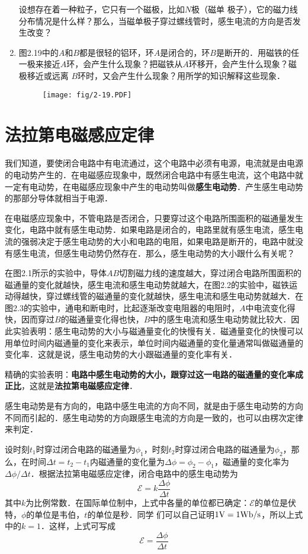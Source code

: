 \begin{enumerate}
  设想存在着一种粒子，它只有一个磁极，比如$N$极（磁单
  极子），它的磁力线分布情况是什么样？那么，当磁单极子穿过螺线管时，感生电流的方向是否发生改变？
  \item 图2.19中的$A$和$B$都是很轻的铝环，环$A$是闭合的，环$B$是断开的．用磁铁的任一极来接近$A$环，会产生什么现象？把磁铁从$A$环移开，会产生什么现象？磁极移近或远离
  $B$环时，又会产生什么现象？用所学的知识解释这些现象．
\begin{figure}[htp]\centering
\texttt{[image: fig/2-19.PDF]}
\caption{}
\end{figure}
\end{enumerate}

\section{法拉第电磁感应定律}

我们知道，要使闭合电路中有电流通过，这个电路中必须有电源，电流就是由电源的电动势产生的．在电磁感应现象中，既然闭合电路中有感生电流，这个电路中就一定有电动势，在电磁感应现象中产生的电动势叫做\textbf{感生电动势}．产生感生电动势的那部分导体就相当于电源．

在电磁感应现象中，不管电路是否闭合，只要穿过这个电路所围面积的磁通量发生变化，电路中就有感生电动势．如果电路是闭合的，电路里就有感生电流，感生电流的强弱决定于感生电动势的大小和电路的电阻，如果电路是断开的，电路中就没有感生电流，但感生电动势仍然存在．那么，感生电动势的大小跟什么有关呢？

在图2.1所示的实验中，导体$AB$切割磁力线的速度越大，穿过闭合电路所围面积的磁通量的变化就越快，感生电流和感生电动势就越大，在图2.2的实验中，磁铁运动得越快，穿过螺线管的磁通量的变化就越快，感生电流和感生电动势就越大．在图2.3的实验中，通电和断电时，比起逐渐改变电阻器的电阻时，$A$中电流变化得快，因而穿过$B$的磁通量变化得也快，$B$中的感生电流和感生电动势就比较大．因此实验表明：感生电动势的大小与磁通量变化的快慢有关．磁通量变化的快慢可以用单位时间内磁通量的变化来表示，单位时间内磁通量的变化量通常叫做磁通量的变化率．这就是说，感生电动势的大小跟磁通量的变化率有关．

精确的实验表明：\textbf{电路中感生电动势的大小，跟穿过这一电路的磁通量的变化率成正比}，这就是\textbf{法拉第电磁感应定律}．

感生电动势是有方向的，电路中感生电流的方向不同，就是由于感生电动势的方向不同而引起的．感生电动势的方向跟感生电流的方向是一致的，也可以由楞次定律来判定．

设时刻$t_1$时穿过闭合电路的磁通量为$\phi_1$，时刻$t_2$时穿过闭合电路的磁通量为$\phi_2$，那么，在时间$\Delta t=t_2-t_1$内磁通量的变化量为$\Delta \phi=\phi_2-\phi_1$，磁通量的变化率为$\Delta \phi/\Delta t$．根据法拉第电磁感应定律，闭合电路中的感生电动势为
\[\mathcal{E}=k\frac{\Delta \phi}{\Delta t}\]
其中$k$为比例常数．在国际单位制中，上式中各量的单位都已确定：$\mathcal{E}$的单位是伏特，$\phi$的单位是韦伯，$t$的单位是秒．同学
们可以自己证明$1{\rm V}=1{\rm Wb}/{\rm s}$，所以上式中的$k=1$．这样，上式可写成
\begin{equation}
    \mathcal{E}=\frac{\Delta \phi}{\Delta t}
\end{equation}

